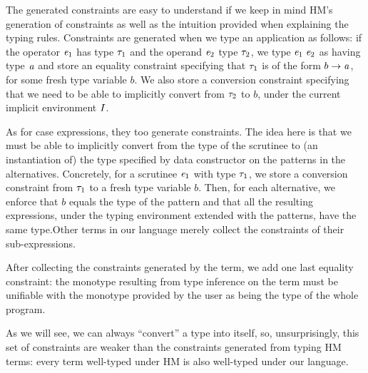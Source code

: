 The generated constraints are easy to understand if we keep in mind HM's generation of constraints as well as the intuition provided when explaining the typing rules. Constraints are generated when we type an application as follows: if the operator $\mathit{e}_1$ has type $\mathit{\tau}_1$ and the operand $\mathit{e}_2$ type $\mathit{\tau}_2$, we type $\mathit{e}_1\;\mathit{e}_2$ as having type $\mathit{a}$ and store an equality constraint specifying that $\mathit{\tau}_1$ is of the form $b \to \mathit{a}$, for some fresh type variable $b$. We also store a conversion constraint specifying that we need to be able to implicitly convert from $\mathit{\tau}_2$ to $b$, under the current implicit environment $I$.

As for case expressions, they too generate constraints. The idea here is that we must be able to implicitly convert from the type of the scrutinee to (an instantiation of) the type specified by data constructor on the patterns in the alternatives. Concretely, for a scrutinee  $\mathit{e}_1$ with type $\mathit{\tau}_1$, we store a conversion constraint from $\mathit{\tau}_1$ to a fresh type variable $b$. Then, for each alternative, we enforce that $b$ equals the type of the pattern and that all the resulting expressions, under the typing environment extended with the patterns, have the same type.Other terms in our language merely collect the constraints of their sub-expressions.

After collecting the constraints generated by the term, we add one last equality constraint: the monotype resulting from type inference on the term must be unifiable with the monotype provided by the user as being the type of the whole program.

As we will see, we can always ``convert'' a type into itself, so, unsurprisingly,  this set of constraints are weaker than the constraints generated from typing HM terms: every term well-typed under HM is also well-typed under our language.


